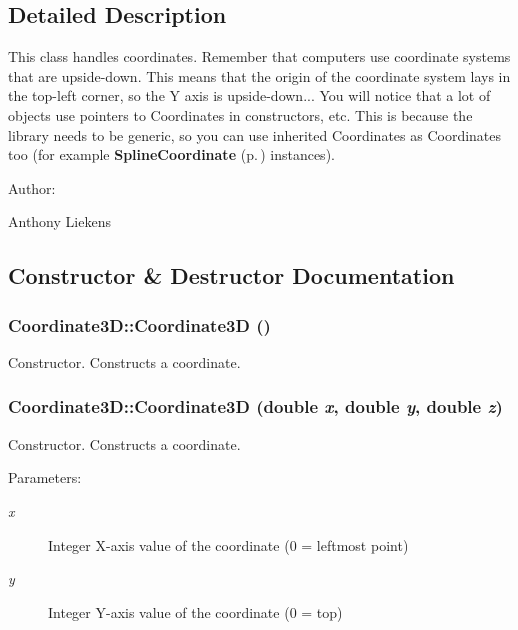 \subsection{Detailed Description}
This class handles coordinates. Remember that computers use coordinate systems that are upside-down. This means that the origin of the coordinate system lays in the top-left corner, so the Y axis is upside-down... You will notice that a lot of objects use pointers to Coordinates in constructors, etc. This is because the library needs to be generic, so you can use inherited Coordinates as Coordinates too (for example {\bf Spline\-Coordinate} {\rm (p.\,\pageref{classSplineCoordinate})} instances). \begin{Desc}
\item[Author: ]\par
Anthony Liekens \end{Desc}




\subsection{Constructor \& Destructor Documentation}
\subsubsection{\setlength{\rightskip}{0pt plus 5cm}Coordinate3D::Coordinate3D ()}\label{classCoordinate3D_a0}


Constructor. Constructs a coordinate. 
\subsubsection{\setlength{\rightskip}{0pt plus 5cm}Coordinate3D::Coordinate3D (double {\em x}, double {\em y}, double {\em z})}\label{classCoordinate3D_a1}


Constructor. Constructs a coordinate. \begin{Desc}
\item[Parameters: ]\par
\begin{description}
\item[{\em 
x}]Integer X-axis value of the coordinate (0 = leftmost point) \item[{\em 
y}]Integer Y-axis value of the coordinate (0 = top) \end{description}
\end{Desc}
